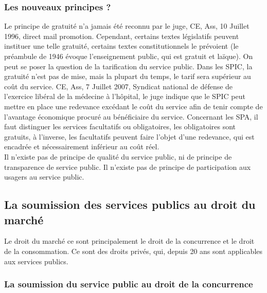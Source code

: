 \documentclass[10pt, a4paper, openany]{book}
\begin{document}
\subsubsection{Les nouveaux principes ?}

Le principe de gratuité n'a jamais été reconnu par le juge, CE, Ass, 10 Juillet 1996, direct mail promotion. Cependant, certains textes législatifs peuvent instituer une telle gratuité, certains textes constitutionnels le prévoient (le préambule de 1946 évoque l'enseignement public, qui est gratuit et laïque). On peut se poser la question de la tarification du service public. Dans les SPIC, la gratuité n'est pas de mise, mais la plupart du temps, le tarif sera supérieur au coût du service. CE, Ass, 7 Juillet 2007, Syndicat national de défense de l'exercice libéral de la médecine à l'hôpital, le juge indique que le SPIC peut mettre en place une redevance excédant le coût du service afin de tenir compte de l'avantage économique procuré au bénéficiaire du service. Concernant les SPA, il faut distinguer les services facultatifs ou obligatoires, les obligatoires sont gratuits, à l'inverse, les facultatifs peuvent faire l'objet d'une redevance, qui est encadrée et nécessairement inférieur au coût réel. \\
Il n'existe pas de principe de qualité du service public, ni de principe de transparence de service public. Il n'existe pas de principe de participation aux usagers au service public. 


\subsection{La soumission des services publics au droit du marché}

Le droit du marché ce sont principalement le droit de la concurrence et le droit de la consommation. Ce sont des droits privés, qui, depuis 20 ans sont applicables aux services publics.

\subsubsection{La soumission du service public au droit de la concurrence}
\end{document}
